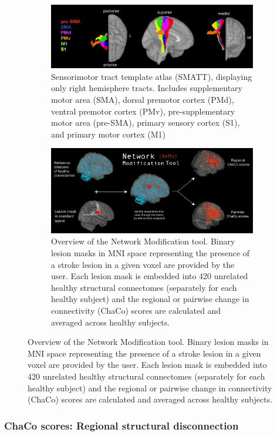 \documentclass[10pt]{article}
\begin{document}
\begin{figure}
\begin{subfigure}{1\textwidth}
  \centering
  \includegraphics[width=1\linewidth]{figures/smatt_template.png}
  \caption{Sensorimotor tract template atlas (SMATT), displaying only right hemisphere tracts. Includes supplementary motor area (SMA), dorsal premotor cortex (PMd), ventral premotor cortex (PMv), pre-supplementary motor area (pre-SMA), primary sensory cortex (S1),  and primary motor cortex (M1)}
  \label{fig:fig1}
\end{subfigure}
\caption{Lesion biomarkers}
\label{fig:fig}

\begin{subfigure}{1\textwidth}
  \centering
  \includegraphics[width=1\linewidth]{figures/NetworkModificationTool.png}
  \caption{Overview of the Network Modification tool. Binary lesion masks in MNI space representing the presence of a stroke lesion in a given voxel are provided by the user. Each lesion mask is embedded into 420 unrelated healthy structural connectomes (separately for each healthy subject) and the regional or pairwise change in connectivity (ChaCo) scores are calculated and averaged across healthy subjects. }
  \label{fig:fig2}
\end{subfigure}

\end{figure}

\subsubsection{ChaCo scores: Regional structural disconnection}
\end{document}
